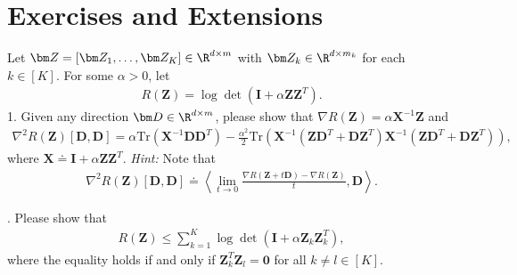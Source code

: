 \documentclass[../../book-main.tex]{subfiles}
\begin{document}
\section{Exercises and Extensions}


\begin{exercise}
    Let $\bm Z = [\bm Z_1,\dots,\bm Z_K] \in \R^{d\times m}$ with $\bm Z_k \in \R^{d\times m_k}$ for each $k \in [K]$. For some $\alpha > 0$, let 
    \begin{align*}
        R(\bm Z) = \log\det\left(\bm I + \alpha\bm Z\bm Z^T \right).
    \end{align*}
1. Given any direction $\bm D \in \R^{d\times m}$, please show that $\nabla R(\bm Z) = \alpha\bm X^{-1}\bm Z$ and 
    \begin{align*}
 \nabla^2 R(\bm Z)[\bm D, \bm D] =\alpha \mathrm{Tr}\left( \bm X^{-1}\bm D\bm D^T\right) - \frac{\alpha^2}{2}\mathrm{Tr}\left(\bm X^{-1}\left( \bm Z\bm D^T+\bm D\bm Z^T\right) \bm X^{-1}\left( \bm Z\bm D^T+\bm D\bm Z^T\right)\right),
    \end{align*}
    where $\bm X \doteq \bm I + \alpha\bm Z\bm Z^T$. {\em Hint:} Note that
    \begin{align*}
        \nabla^2 R(\bm Z)[\bm D, \bm D] \doteq \left\langle \lim_{t \to 0} \frac{\nabla R(\bm Z+ t\bm D) - \nabla R(\bm Z)}{t}, \bm D \right\rangle. 
    \end{align*}

. Please show that 
\begin{align*}
    R(\bm Z) \le \sum_{k=1}^K \log\det\left(\bm I + \alpha\bm Z_k\bm Z_k^T \right),
\end{align*}
where the equality holds if and only if $\bm Z_k^T\bm Z_l = \bm 0$ for all $k \neq l \in [K]$. 
\medskip 


\end{exercise}
\end{document}
